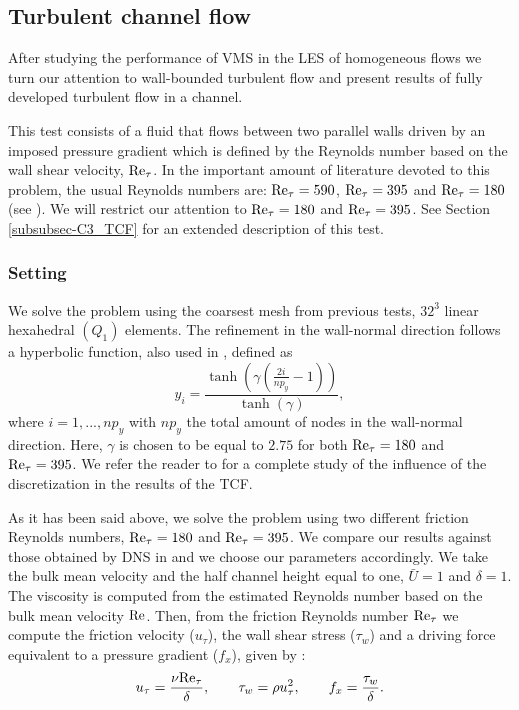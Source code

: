 \subsection{Turbulent channel flow}
\label{subsec-C4_TCF}
After studying the performance of VMS in the LES of homogeneous flows we turn our attention to wall-bounded turbulent flow and present results of fully developed turbulent flow in a channel.

This test consists of a fluid that flows between two parallel walls driven by an imposed pressure gradient which is defined by the Reynolds number based on the wall shear velocity, ${\rm Re}_\tau$. In the important amount of literature devoted to this problem, the usual Reynolds numbers are: ${\rm Re}_\tau=590$, ${\rm Re}_\tau=395$  and ${\rm Re}_\tau=180$ (see \cite{bazilevs_variational_2007, calderer_residual-based_2013, gamnitzer_time-dependent_2010, gravemeier_algebraic_2010, gullbrand_effect_2003, hughes_large_2001, john_variants_2008, kim_turbulence_1987, masud_variational_2011, moser_direct_1999}). We will restrict our attention to ${\rm Re}_\tau=180$ and ${\rm Re}_\tau=395$. See Section \ref{subsubsec-C3_TCF} for an extended description of this test.

\subsubsection{Setting}
\label{subsubsec-C4_TCF_setting}

We solve the problem using the coarsest mesh from previous tests, $32^3$ linear hexahedral $(Q_1)$ elements. The refinement in the wall-normal direction follows a hyperbolic function, also used in \cite{calderer_residual-based_2013,  gamnitzer_time-dependent_2010,  gravemeier_algebraic_2010, gullbrand_effect_2003, masud_variational_2011}, defined as 
$$y_i=\frac{\tanh\left(\gamma\left(\frac{2i}{np_y}-1\right)\right)}{\tanh(\gamma)},$$
where $i=1,...,np_y$ with $np_y$ the total amount of nodes in the wall-normal direction. Here, $\gamma$ is  chosen to be equal to $2.75$ for both  ${\rm Re}_\tau=180$ and ${\rm Re}_\tau=395$.  We refer the reader to \cite{avila_large_2014} for a complete study of the influence of the discretization in the results of the TCF.

As it has been said above, we solve the problem using two different friction Reynolds numbers, ${\rm Re}_\tau=180$ and ${\rm Re}_\tau=395$. We compare our results against those obtained by DNS in \cite{moser_direct_1999,kim_turbulence_1987} and we choose our parameters accordingly.
We take the bulk mean velocity and the half channel height equal to one, $\bar{U}=1$ and $\delta=1$. The viscosity is computed from the estimated Reynolds number based on the bulk mean velocity ${\rm Re}$. Then, from the friction Reynolds number ${\rm Re}_\tau$ we compute the friction velocity ($u_\tau$), the wall shear stress ($\tau_w$) and a driving force equivalent to a pressure gradient ($f_x$), given by  \cite{pope_turbulent_2000}:
$$u_\tau=\frac{\nu {\rm Re}_\tau}{\delta},\quad\quad\tau_w=\rho u_\tau^2,\quad\quad
f_x=\frac{\tau_w}{\delta}.$$

